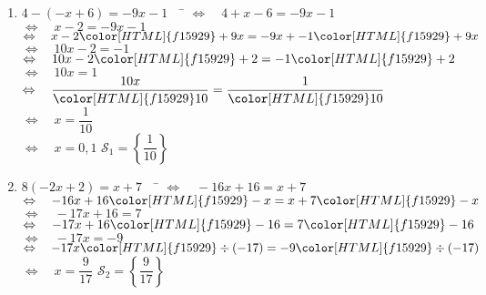 \documentclass[a4paper,11pt,exos]{nsi} %
\begin{document}
\begin{enumerate}
    \item 	\begin{tabbing}
        $ 4-(-x+6)=-9x-1 \quad$		\=	$\Leftrightarrow\quad 4+x-6=-9x-1 $\\
        \>	$\Leftrightarrow\quad	x-2=-9x-1 $\\[.5em]
        \>	$\Leftrightarrow\quad	x-2{\color[HTML]{f15929}+9x}=-9x+-1{\color[HTML]{f15929}+9x} $\\[.5em]
        \>	$\Leftrightarrow\quad	10x-2=-1 $\\[.5em]
        \>	$\Leftrightarrow\quad	10x-2{\color[HTML]{f15929}+2}=-1{\color[HTML]{f15929}+2} $\\[.5em]
        \>	$\Leftrightarrow\quad	10x=1 $\\[.5em]
        \>	$\Leftrightarrow\quad	\dfrac{10x}{\color[HTML]{f15929}10}=\dfrac{1}{\color[HTML]{f15929}10} $\\[.5em]
        \>	$\Leftrightarrow\quad	x=\dfrac{1}{10}$\\
        \>	$\Leftrightarrow\quad	x=0,1 $	\hspace{4cm} $\mathcal{S}_1=\left\{ \dfrac{1}{10} \right\}$
    \end{tabbing}	
    
            
    \item 	\begin{tabbing}
        $ 8(-2x+2)=x+7 \quad$		\=	$\Leftrightarrow\quad -16x+16=x+7 $\\
        \>	$\Leftrightarrow\quad	-16x+16{\color[HTML]{f15929}-x}=x+7{\color[HTML]{f15929}-x} $\\[.5em]
        \>	$\Leftrightarrow\quad	-17x+16=7 $\\[.5em]
        \>	$\Leftrightarrow\quad	-17x+16{\color[HTML]{f15929}-16}=7{\color[HTML]{f15929}-16} $\\[.5em]
        \>	$\Leftrightarrow\quad	-17x=-9 $\\[.5em]
        \>	$\Leftrightarrow\quad	-17x{\color[HTML]{f15929}\div(-17)}=-9{\color[HTML]{f15929}\div(-17)} $\\[.5em]
        \>	$\Leftrightarrow\quad	x=\dfrac{9}{17} $ \hspace{4cm} $\mathcal{S}_2=\left\{ \dfrac{9}{17} \right\}$
    \end{tabbing}
    

\end{enumerate}
\end{document}
